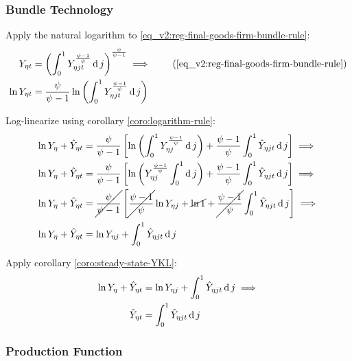 \documentclass[../thesis.tex]{subfiles}
\begin{document}
\subsubsection*{Bundle Technology}

Apply the natural logarithm to \ref{eq_v2:reg-final-goods-firm-bundle-rule}:
\begin{align}
	Y_{\eta t} &= \left( \int_{0}^{1} Y_{\eta jt}^{\frac{\psi-1}{\psi}} \dif j \right)^{\frac{\psi}{\psi-1}} \implies  \tag{\ref{eq_v2:reg-final-goods-firm-bundle-rule}} \\
	\ln{Y_{\eta t}} &= {\frac{\psi}{\psi-1}} \ln{\left( \int_{0}^{1} Y_{\eta jt}^{\frac{\psi-1}{\psi}} \dif j \right)} \nonumber
\end{align}

Log-linearize using corollary \ref{coro:logarithm-rule}:
\begin{align}
	\ln{Y_{\eta}} + \hat{Y}_{\eta t} &= \frac{\psi}{\psi-1} \left[ \ln \left( \int_{0}^{1} Y_{\eta j}^{\frac{\psi-1}{\psi}} \operatorname{d} j \right) + \frac{\psi-1}{\psi} \int_{0}^{1} \hat{Y}_{\eta jt} \operatorname{d} j \right] \implies \nonumber
	\\
	\ln{Y_{\eta}} + \hat{Y}_{\eta t} &= \frac{\psi}{\psi-1} \left[ \ln \left( Y_{\eta j}^{\frac{\psi-1}{\psi}} \int_{0}^{1} \operatorname{d} j \right) + \frac{\psi-1}{\psi} \int_{0}^{1} \hat{Y}_{\eta jt} \operatorname{d} j \right] \implies \nonumber
	\\
	\ln{Y_{\eta}} + \hat{Y}_{\eta t} &= \cancel{\frac{\psi}{\psi-1}} \left[ \cancel{\frac{\psi-1}{\psi}} \ln{Y_{\eta j}} + \cancel{\ln1} + \cancel{\frac{\psi-1}{\psi}} \int_{0}^{1} \hat{Y}_{\eta jt} \operatorname{d} j \right] \implies \nonumber
	\\
	\ln{Y_{\eta}} + \hat{Y}_{\eta t} &= \ln{Y_{\eta j}} + \int_{0}^{1} \hat{Y}_{\eta jt} \operatorname{d} j \nonumber
\end{align}

Apply corollary \ref{coro:steady-state-YKL}:
\begin{align}
	\ln{Y_{\eta}} + \hat{Y}_{\eta t} &= \ln{Y_{\eta j}} + \int_{0}^{1} \hat{Y}_{\eta jt} \operatorname{d} j \implies \nonumber \\
	\hat{Y}_{\eta t} &= \int_{0}^{1} \hat{Y}_{\eta jt} \operatorname{d} j 
	\label{eq_v2:reg-ll-final-goods-firm-bundle-rule}
\end{align}


\subsubsection*{Production Function}
\end{document}
